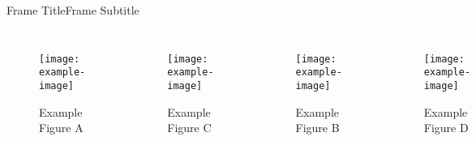 \begin{frame}{Frame Title}{Frame Subtitle}
    \begin{columns}
        \begin{figure}
            \begin{center}
                \texttt{[image: example-image]}
                \caption{Example Figure A}
            \end{center}
        \end{figure}
        \begin{figure}
            \begin{center}
                \texttt{[image: example-image]}
                \caption{Example Figure C}
            \end{center}
        \end{figure}
        \begin{figure}
            \begin{center}
                \texttt{[image: example-image]}
                \caption{Example Figure B}
            \end{center}
        \end{figure}
        \begin{figure}
            \begin{center}
                \texttt{[image: example-image]}
                \caption{Example Figure D}
            \end{center}
        \end{figure}
    \end{columns}
\end{frame}
